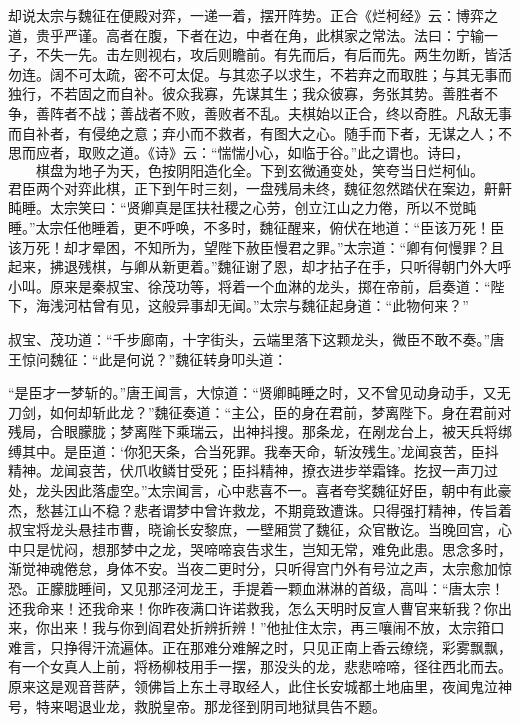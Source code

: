 \documentclass[12pt]{lsbook}
\begin{document}
却说太宗与魏征在便殿对弈，一递一着，摆开阵势。正合《烂柯经》云：博弈之道，贵乎严谨。高者在腹，下者在边，中者在角，此棋家之常法。法曰：宁输一子，不失一先。击左则视右，攻后则瞻前。有先而后，有后而先。两生勿断，皆活勿连。阔不可太疏，密不可太促。与其恋子以求生，不若弃之而取胜；与其无事而独行，不若固之而自补。彼众我寡，先谋其生；我众彼寡，务张其势。善胜者不争，善阵者不战；善战者不败，善败者不乱。夫棋始以正合，终以奇胜。凡敌无事而自补者，有侵绝之意；弃小而不救者，有图大之心。随手而下者，无谋之人；不思而应者，取败之道。《诗》云：“惴惴小心，如临于谷。”此之谓也。诗曰，
\[
棋盘为地子为天，色按阴阳造化全。

下到玄微通变处，笑夸当日烂柯仙。
\]
君臣两个对弈此棋，正下到午时三刻，一盘残局未终，魏征忽然踏伏在案边，鼾鼾盹睡。太宗笑曰：“贤卿真是匡扶社稷之心劳，创立江山之力倦，所以不觉盹睡。”太宗任他睡着，更不呼唤，不多时，魏征醒来，俯伏在地道：“臣该万死！臣该万死！却才晕困，不知所为，望陛下赦臣慢君之罪。”太宗道：“卿有何慢罪？且起来，拂退残棋，与卿从新更着。”魏征谢了恩，却才拈子在手，只听得朝门外大呼小叫。原来是秦叔宝、徐茂功等，将着一个血淋的龙头，掷在帝前，启奏道：“陛下，海浅河枯曾有见，这般异事却无闻。”太宗与魏征起身道：“此物何来？”

叔宝、茂功道：“千步廊南，十字街头，云端里落下这颗龙头，微臣不敢不奏。”唐王惊问魏征：“此是何说？”魏征转身叩头道：

“是臣才一梦斩的。”唐王闻言，大惊道：“贤卿盹睡之时，又不曾见动身动手，又无刀剑，如何却斩此龙？”魏征奏道：“主公，臣的身在君前，梦离陛下。身在君前对残局，合眼朦胧；梦离陛下乘瑞云，出神抖搜。那条龙，在剐龙台上，被天兵将绑缚其中。是臣道：‘你犯天条，合当死罪。我奉天命，斩汝残生。’龙闻哀苦，臣抖精神。龙闻哀苦，伏爪收鳞甘受死；臣抖精神，撩衣进步举霜锋。扢扠一声刀过处，龙头因此落虚空。”太宗闻言，心中悲喜不一。喜者夸奖魏征好臣，朝中有此豪杰，愁甚江山不稳？悲者谓梦中曾许救龙，不期竟致遭诛。只得强打精神，传旨着叔宝将龙头悬挂市曹，晓谕长安黎庶，一壁厢赏了魏征，众官散讫。当晚回宫，心中只是忧闷，想那梦中之龙，哭啼啼哀告求生，岂知无常，难免此患。思念多时，渐觉神魂倦怠，身体不安。当夜二更时分，只听得宫门外有号泣之声，太宗愈加惊恐。正朦胧睡间，又见那泾河龙王，手提着一颗血淋淋的首级，高叫：“唐太宗！还我命来！还我命来！你昨夜满口许诺救我，怎么天明时反宣人曹官来斩我？你出来，你出来！我与你到阎君处折辨折辨！”他扯住太宗，再三嚷闹不放，太宗箝口难言，只挣得汗流遍体。正在那难分难解之时，只见正南上香云缭绕，彩雾飘飘，有一个女真人上前，将杨柳枝用手一摆，那没头的龙，悲悲啼啼，径往西北而去。原来这是观音菩萨，领佛旨上东土寻取经人，此住长安城都土地庙里，夜闻鬼泣神号，特来喝退业龙，救脱皇帝。那龙径到阴司地狱具告不题。
\end{document}
